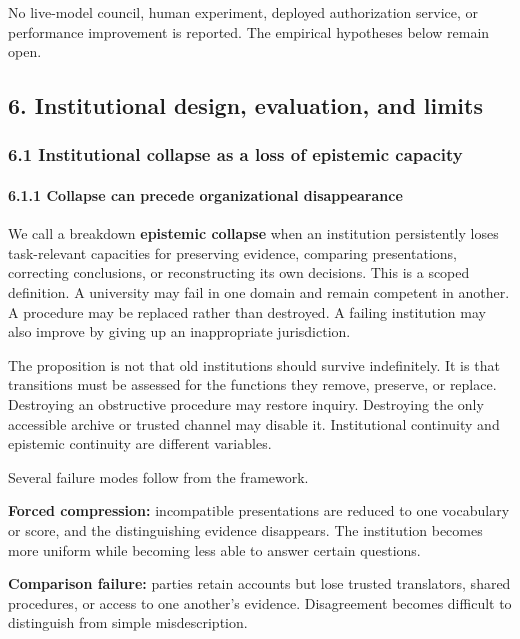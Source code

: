 \documentclass[
  10pt,
]{article}
\begin{document}
No live-model council, human experiment, deployed authorization service, or performance improvement is reported. The empirical hypotheses below remain open.

\subsection{6. Institutional design, evaluation, and limits}\label{institutional-design-evaluation-and-limits}

\subsubsection{6.1 Institutional collapse as a loss of epistemic capacity}\label{institutional-collapse-as-a-loss-of-epistemic-capacity}

\paragraph{6.1.1 Collapse can precede organizational disappearance}\label{collapse-can-precede-organizational-disappearance}

We call a breakdown \textbf{epistemic collapse} when an institution persistently loses task-relevant capacities for preserving evidence, comparing presentations, correcting conclusions, or reconstructing its own decisions. This is a scoped definition. A university may fail in one domain and remain competent in another. A procedure may be replaced rather than destroyed. A failing institution may also improve by giving up an inappropriate jurisdiction.

The proposition is not that old institutions should survive indefinitely. It is that transitions must be assessed for the functions they remove, preserve, or replace. Destroying an obstructive procedure may restore inquiry. Destroying the only accessible archive or trusted channel may disable it. Institutional continuity and epistemic continuity are different variables.

Several failure modes follow from the framework.

\textbf{Forced compression:} incompatible presentations are reduced to one vocabulary or score, and the distinguishing evidence disappears. The institution becomes more uniform while becoming less able to answer certain questions.

\textbf{Comparison failure:} parties retain accounts but lose trusted translators, shared procedures, or access to one another's evidence. Disagreement becomes difficult to distinguish from simple misdescription.
\end{document}
